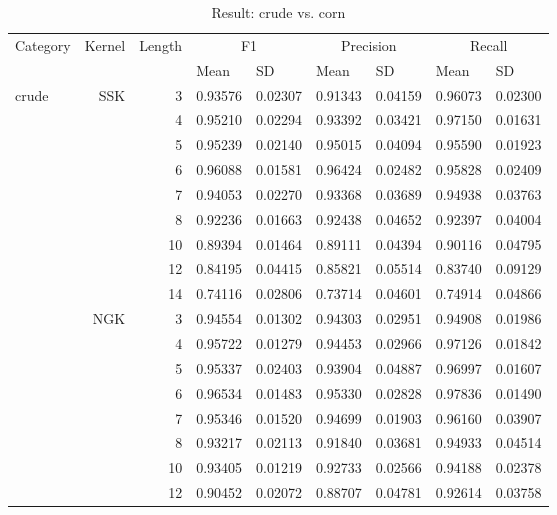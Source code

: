 \documentclass{article}
\theoremstyle{definition}
\begin{document}
\begin{table}[]
\centering
\caption{Result: crude vs. corn}
\label{}
\begin{tabular}{|l|r|r|r|r|r|r|r|r|}
\hline
\multicolumn{1}{|c|}{Category} & 
\multicolumn{1}{c|}{Kernel} & 
\multicolumn{1}{c|}{Length} & 
\multicolumn{2}{c|}{F1} & 
\multicolumn{2}{c|}{Precision} & 
\multicolumn{2}{c|}{Recall}\\
&
\multicolumn{1}{l|}{} & 
\multicolumn{1}{l|}{} & 
\multicolumn{1}{l|}{Mean} & \multicolumn{1}{l|}{SD} & \multicolumn{1}{l|}{Mean} & \multicolumn{1}{l|}{SD} & \multicolumn{1}{l|}{Mean} & \multicolumn{1}{l|}{SD} \\ \hline
\multirow{19}{*}{crude}   
   & SSK & 3   &0.93576  &0.02307  &0.91343  &0.04159  &0.96073  &0.02300\\
   &   & 4   &0.95210  &0.02294  &0.93392  &0.03421  &0.97150  &0.01631\\
   &   & 5   &0.95239  &0.02140  &0.95015  &0.04094  &0.95590  &0.01923\\
   &   & 6   &0.96088  &0.01581  &0.96424  &0.02482  &0.95828  &0.02409\\
   &   & 7   &0.94053  &0.02270  &0.93368  &0.03689  &0.94938  &0.03763\\
   &   & 8   &0.92236  &0.01663  &0.92438  &0.04652  &0.92397  &0.04004\\
   &   & 10  &0.89394  &0.01464  &0.89111  &0.04394  &0.90116  &0.04795\\
   &   & 12  &0.84195  &0.04415  &0.85821  &0.05514  &0.83740  &0.09129\\
   &   & 14  &0.74116  &0.02806  &0.73714  &0.04601  &0.74914  &0.04866\\ \cline{2-9} 
   & NGK & 3   &0.94554 &0.01302 &0.94303 &0.02951 &0.94908 &0.01986\\
   &   & 4   &0.95722 &0.01279 &0.94453 &0.02966 &0.97126 &0.01842\\
   &   & 5   &0.95337 &0.02403 &0.93904 &0.04887 &0.96997 &0.01607\\
   &   & 6   &0.96534 &0.01483 &0.95330 &0.02828 &0.97836 &0.01490\\
   &   & 7   &0.95346 &0.01520 &0.94699 &0.01903 &0.96160 &0.03907\\
   &   & 8   &0.93217 &0.02113 &0.91840 &0.03681 &0.94933 &0.04514\\
   &   & 10  &0.93405 &0.01219 &0.92733 &0.02566 &0.94188 &0.02378\\
   &   & 12  &0.90452 &0.02072 &0.88707 &0.04781 &0.92614 &0.03758\\

\end{tabular}
\end{table}
\end{document}
